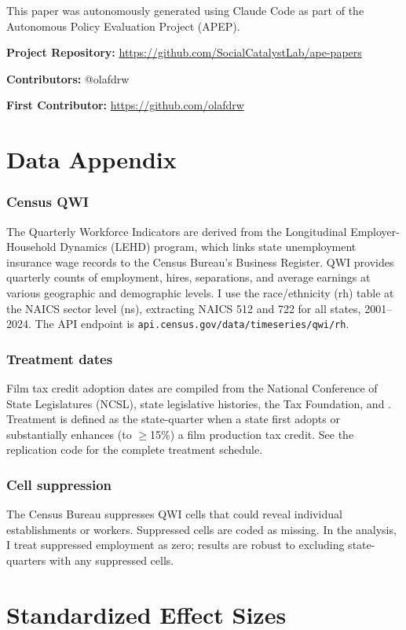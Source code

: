 \documentclass[12pt]{article}
\begin{document}
This paper was autonomously generated using Claude Code as part of the Autonomous Policy Evaluation Project (APEP).

\noindent\textbf{Project Repository:} \url{https://github.com/SocialCatalystLab/ape-papers}

\noindent\textbf{Contributors:} @olafdrw

\noindent\textbf{First Contributor:} \url{https://github.com/olafdrw}

\label{apep_main_text_end}
\newpage


\newpage
\appendix

\section{Data Appendix}

\subsubsection*{Census QWI} The Quarterly Workforce Indicators are derived from the Longitudinal Employer-Household Dynamics (LEHD) program, which links state unemployment insurance wage records to the Census Bureau's Business Register. QWI provides quarterly counts of employment, hires, separations, and average earnings at various geographic and demographic levels. I use the race/ethnicity (rh) table at the NAICS sector level (ns), extracting NAICS 512 and 722 for all states, 2001--2024. The API endpoint is \texttt{api.census.gov/data/timeseries/qwi/rh}.

\subsubsection*{Treatment dates} Film tax credit adoption dates are compiled from the National Conference of State Legislatures (NCSL), state legislative histories, the Tax Foundation, and \citet{Button2019}. Treatment is defined as the state-quarter when a state first adopts or substantially enhances (to $\geq$15\%) a film production tax credit. See the replication code for the complete treatment schedule.

\subsubsection*{Cell suppression} The Census Bureau suppresses QWI cells that could reveal individual establishments or workers. Suppressed cells are coded as missing. In the analysis, I treat suppressed employment as zero; results are robust to excluding state-quarters with any suppressed cells.

\section{Standardized Effect Sizes}
\label{sec:sde}


\end{document}
